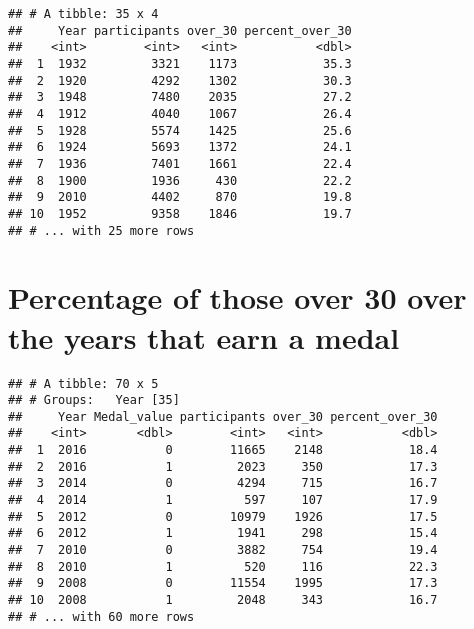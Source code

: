 \documentclass[]{article}
\newenvironment{Shaded}{\begin{snugshade}}{\end{snugshade}}
\newcommand{\KeywordTok}[1]{\textcolor[rgb]{0.13,0.29,0.53}{\textbf{#1}}}
\newcommand{\DataTypeTok}[1]{\textcolor[rgb]{0.13,0.29,0.53}{#1}}
\newcommand{\DecValTok}[1]{\textcolor[rgb]{0.00,0.00,0.81}{#1}}
\newcommand{\StringTok}[1]{\textcolor[rgb]{0.31,0.60,0.02}{#1}}
\newcommand{\OperatorTok}[1]{\textcolor[rgb]{0.81,0.36,0.00}{\textbf{#1}}}
\newcommand{\NormalTok}[1]{#1}
\begin{document}
\begin{verbatim}
## # A tibble: 35 x 4
##     Year participants over_30 percent_over_30
##    <int>        <int>   <int>           <dbl>
##  1  1932         3321    1173            35.3
##  2  1920         4292    1302            30.3
##  3  1948         7480    2035            27.2
##  4  1912         4040    1067            26.4
##  5  1928         5574    1425            25.6
##  6  1924         5693    1372            24.1
##  7  1936         7401    1661            22.4
##  8  1900         1936     430            22.2
##  9  2010         4402     870            19.8
## 10  1952         9358    1846            19.7
## # ... with 25 more rows
\end{verbatim}

\section{Percentage of those over 30 over the years that earn a
medal}\label{percentage-of-those-over-30-over-the-years-that-earn-a-medal}

\begin{Shaded}
\end{Shaded}

\begin{verbatim}
## # A tibble: 70 x 5
## # Groups:   Year [35]
##     Year Medal_value participants over_30 percent_over_30
##    <int>       <dbl>        <int>   <int>           <dbl>
##  1  2016           0        11665    2148            18.4
##  2  2016           1         2023     350            17.3
##  3  2014           0         4294     715            16.7
##  4  2014           1          597     107            17.9
##  5  2012           0        10979    1926            17.5
##  6  2012           1         1941     298            15.4
##  7  2010           0         3882     754            19.4
##  8  2010           1          520     116            22.3
##  9  2008           0        11554    1995            17.3
## 10  2008           1         2048     343            16.7
## # ... with 60 more rows
\end{verbatim}
\end{document}
